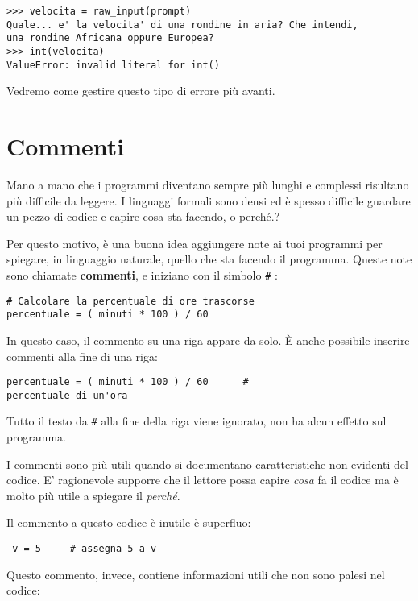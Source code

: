 \beforeverb \begin{verbatim}
>>> velocita = raw_input(prompt)
Quale... e' la velocita' di una rondine in aria? Che intendi,
una rondine Africana oppure Europea?
>>> int(velocita)
ValueError: invalid literal for int() \end{verbatim} \afterverb
%
Vedremo come gestire questo tipo di errore pi\`{u} avanti.

 


\section{Commenti} 

Mano a mano che i programmi diventano sempre pi\`{u} lunghi e complessi risultano pi\`{u} difficile da leggere. I linguaggi formali sono densi ed \`{e} spesso difficile guardare un pezzo di codice e capire cosa sta facendo, o perch\'{e}.? 

Per questo motivo, \`{e} una buona idea aggiungere note ai tuoi programmi per spiegare, in linguaggio naturale, quello che sta facendo il programma. Queste note sono chiamate \textbf{commenti}, e iniziano con il simbolo \verb"#" :

\beforeverb \begin{verbatim}
# Calcolare la percentuale di ore trascorse
percentuale = ( minuti * 100 ) / 60 \end{verbatim} \afterverb
%
In questo caso, il commento su una riga appare da solo. \`{E} anche possibile inserire commenti alla fine di una riga:

\beforeverb \begin{verbatim}percentuale = ( minuti * 100 ) / 60      #
percentuale di un'ora \end{verbatim} \afterverb
%
Tutto il testo da {\tt \#} alla fine della riga viene ignorato, non ha alcun effetto sul programma.


I commenti sono pi\`{u} utili quando si documentano caratteristiche non evidenti del codice. E' ragionevole supporre che il lettore possa capire \emph{cosa} fa il codice ma \`{e} molto pi\`{u} utile a spiegare il \emph{perch\'{e}}.


Il commento a questo codice \`{e} inutile \`{e} superfluo:

\beforeverb \begin{verbatim} v = 5     # assegna 5 a v \end{verbatim}
\afterverb
%
Questo commento, invece, contiene informazioni utili che non sono palesi nel codice:

